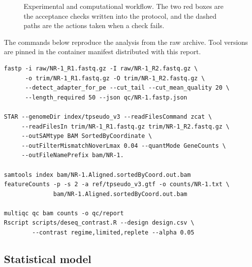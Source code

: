\begin{figure}[t]
{}
  \caption{Experimental and computational workflow. The two red boxes are the
  acceptance checks written into the protocol, and the dashed paths are the
  actions taken when a check fails.}
  \label{fig:workflow}
\end{figure}

The commands below reproduce the analysis from the raw archive. Tool versions
are pinned in the container manifest distributed with this report.

\begin{lstlisting}[style=shellstyle,caption={Pipeline invocation for one
library. The loop over the remaining five differs only in the sample
identifier.},label={lst:pipeline},captionpos=b]
fastp -i raw/NR-1_R1.fastq.gz -I raw/NR-1_R2.fastq.gz \
      -o trim/NR-1_R1.fastq.gz -O trim/NR-1_R2.fastq.gz \
      --detect_adapter_for_pe --cut_tail --cut_mean_quality 20 \
      --length_required 50 --json qc/NR-1.fastp.json

STAR --genomeDir index/tpseudo_v3 --readFilesCommand zcat \
     --readFilesIn trim/NR-1_R1.fastq.gz trim/NR-1_R2.fastq.gz \
     --outSAMtype BAM SortedByCoordinate \
     --outFilterMismatchNoverLmax 0.04 --quantMode GeneCounts \
     --outFileNamePrefix bam/NR-1.

samtools index bam/NR-1.Aligned.sortedByCoord.out.bam
featureCounts -p -s 2 -a ref/tpseudo_v3.gtf -o counts/NR-1.txt \
              bam/NR-1.Aligned.sortedByCoord.out.bam

multiqc qc bam counts -o qc/report
Rscript scripts/deseq_contrast.R --design design.csv \
        --contrast regime,limited,replete --alpha 0.05
\end{lstlisting}

\subsection{Statistical model}

